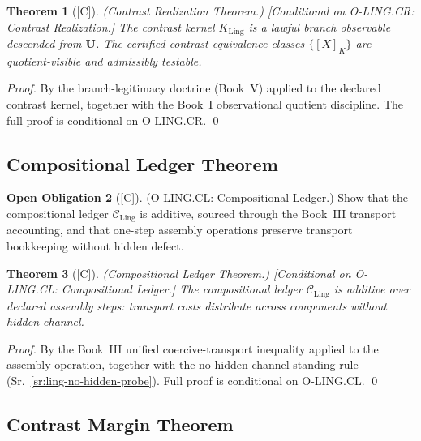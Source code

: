 \documentclass[12pt,oneside]{amsbook}
\theoremstyle{plain}
\newtheorem{theorem}{Theorem}[section]
\theoremstyle{definition}
\newtheorem{obligation}[theorem]{Open Obligation}
\theoremstyle{remark}
\newcommand{\status}[1]{\textup{[#1]}}
\begin{document}
\begin{theorem}[\status{C}]\label{thm:ling-contrast-realization}
\textup{(Contrast Realization Theorem.)}
\textup{[Conditional on O-LING.CR: Contrast Realization.]}
The contrast kernel $K_{\mathrm{Ling}}$ is a lawful branch observable
descended from $\mathbf{U}$. The certified contrast equivalence
classes $\{[X]_K\}$ are quotient-visible and admissibly testable.
\end{theorem}

\begin{proof}
By the branch-legitimacy doctrine (Book~V) applied to the declared
contrast kernel, together with the Book~I observational quotient
discipline. The full proof is conditional on O-LING.CR.
\qed
\end{proof}

\subsection{Compositional Ledger Theorem}\label{sec:ling-CL}

\begin{obligation}[\status{C}]\label{ob:ling-CL}
\textup{(O-LING.CL: Compositional Ledger.)}
Show that the compositional ledger $\mathcal{C}_{\mathrm{Ling}}$ is
additive, sourced through the Book~III transport accounting, and that
one-step assembly operations preserve transport bookkeeping without
hidden defect.
\end{obligation}

\begin{theorem}[\status{C}]\label{thm:ling-comp-ledger}
\textup{(Compositional Ledger Theorem.)}
\textup{[Conditional on O-LING.CL: Compositional Ledger.]}
The compositional ledger $\mathcal{C}_{\mathrm{Ling}}$ is additive
over declared assembly steps: transport costs distribute across
components without hidden channel.
\end{theorem}

\begin{proof}
By the Book~III unified coercive-transport inequality applied to the
assembly operation, together with the no-hidden-channel standing rule
(Sr.~\ref{sr:ling-no-hidden-probe}). Full proof is conditional on
O-LING.CL.
\qed
\end{proof}

\subsection{Contrast Margin Theorem}\label{sec:ling-CM}
\end{document}
